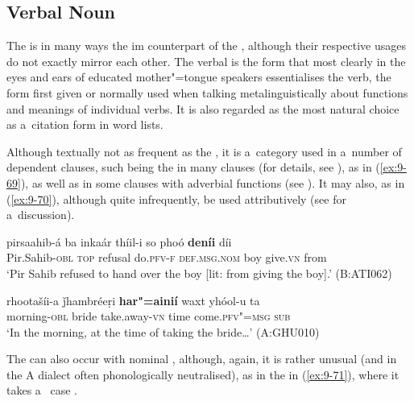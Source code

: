 \subsection{Verbal Noun}
\label{subsec:9-3-3}


The  is in many ways the im counterpart of the , although their respective usages do not exactly mirror each other. The verbal  is the form that most clearly in the eyes and ears of educated mother"=tongue speakers essentialises the verb, the form first given or normally used when talking metalinguistically about functions and meanings of individual verbs. It is also regarded as the most natural choice as a~citation form in word lists. 


Although textually not as frequent as the , it is a~category used in a~number of dependent clauses, such being the  in many  clauses (for details, see ), as in (\ref{ex:9-69}), as well as in some clauses with adverbial functions (see ). It may also, as in (\ref{ex:9-70}), although quite infrequently, be used attributively (see  for a~discussion).

\begin{exe}
\ex
\label{ex:9-69}
\gll pirsaahib-á ba inkaár thíil-i so phoó \textbf{deníi} díi \\
Pir.Sahib-\textsc{obl} \textsc{top} refusal do.\textsc{pfv-f} \textsc{def.msg.nom} boy give.\textsc{vn} from \\
\glt `Pir Sahib refused to hand over the boy [lit: from giving the boy].' (B:ATI062)
\end{exe}

\begin{exe}
\ex
\label{ex:9-70}
\gll rhootašíi-a ǰhambréeṛi \textbf{har"=ainií} waxt yhóol-u ta \\
morning-\textsc{obl} bride take.away-\textsc{vn} time come.\textsc{pfv"=msg} \textsc{sub} \\
\glt `In the morning, at the time of taking the bride{\ldots}' (A:GHU010)
\end{exe}

The  can also occur with nominal , although, again, it is rather unusual (and in the A dialect often phonologically neutralised), as in the   in (\ref{ex:9-71}), where it takes a~ case . 

